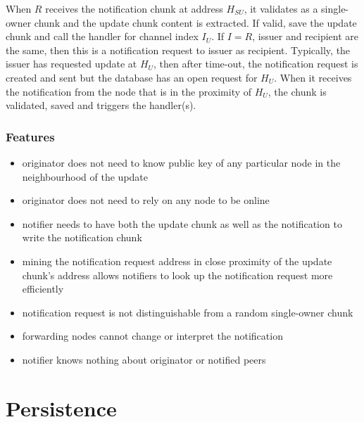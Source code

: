 When $R$ receives the notification chunk at address $H_{SU}$, it validates as a single-owner chunk and the update chunk content is extracted. If valid, save the update chunk and call the handler for channel index $I_U$.
If $I=R$, issuer and recipient are the same, then this is a notification request to issuer as recipient.
Typically, the issuer has requested update at $H_U$, then after time-out, the notification request is created and sent but the database has an open request for $H_U$. When it receives the notification from the node that is in the proximity of $H_U$, the chunk is validated, saved and triggers the handler(s).


\subsubsection{Features}

\begin{itemize}
    \item originator does not need to know public key of any particular node in the neighbourhood of the update
    \item originator does not need to rely on any node to be online
    \item notifier needs to have both the update chunk as well as the notification to write the notification chunk
    \item mining the notification request address in close proximity of the update chunk's address allows notifiers to look up the notification request more efficiently
    \item notification request is not distinguishable from a random single-owner chunk
    \item forwarding nodes cannot change or interpret the notification 
    \item notifier knows nothing about originator or notified peers
\end{itemize}





\section{Persistence}\label{sec:persistence}

